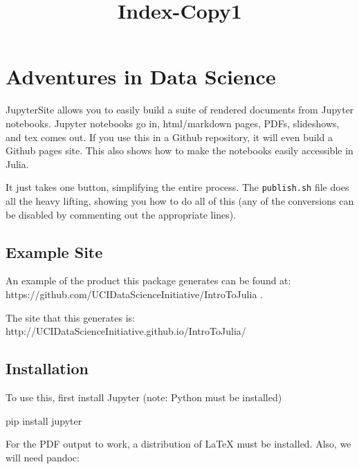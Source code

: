 \documentclass[11pt]{article}
\title{Index-Copy1}
\newenvironment{Shaded}{}{}
\newcommand{\NormalTok}[1]{{#1}}
\newcommand{\ExtensionTok}[1]{{#1}}
\begin{document}
    
    
    \maketitle
    
    

    
    \section{Adventures in Data Science}\label{adventures-in-data-science}

    JupyterSite allows you to easily build a suite of rendered documents
from Jupyter notebooks. Jupyter notebooks go in, html/markdown pages,
PDFs, slideshows, and tex comes out. If you use this in a Github
repository, it will even build a Github pages site. This also shows how
to make the notebooks easily accessible in Julia.

It just takes one button, simplifying the entire process. The
\texttt{publish.sh} file does all the heavy lifting, showing you how to
do all of this (any of the conversions can be disabled by commenting out
the appropriate lines).

    \subsection{Example Site}\label{example-site}

An example of the product this package generates can be found at:
https://github.com/UCIDataScienceInitiative/IntroToJulia .

The site that this generates is:
http://UCIDataScienceInitiative.github.io/IntroToJulia/

    \subsection{Installation}\label{installation}

To use this, first install Jupyter (note: Python must be installed)

\begin{Shaded}
\begin{Highlighting}[]
\ExtensionTok{pip}\NormalTok{ install jupyter}
\end{Highlighting}
\end{Shaded}

For the PDF output to work, a distribution of LaTeX must be installed.
Also, we will need pandoc:
\end{document}
